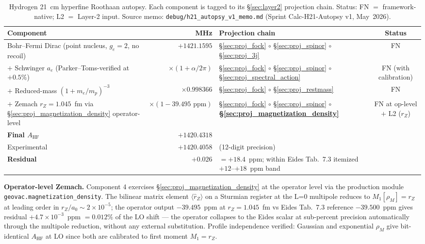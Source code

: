 \documentclass[11pt]{article}
\begin{document}
\begin{table}[h]
\centering\small
\begin{tabular}{p{4cm} r p{6cm} c}
\toprule
Component & MHz & Projection chain & Status \\
\midrule
Bohr--Fermi Dirac (point nucleus, $g_e=2$, no recoil) & $+1421.1595$ &
\S\ref{sec:proj_fock} $\circ$ \S\ref{sec:proj_spinor} $\circ$
\S\ref{sec:proj_3j} & FN \\
$+$ Schwinger $a_e$ (Parker--Toms-verified at $+0.5\%$) & $\times (1+\alpha/2\pi)$ &
\S\ref{sec:proj_fock} $\circ$ \S\ref{sec:proj_spinor} $\circ$
\S\ref{sec:proj_spectral_action} & FN (with calibration) \\
$+$ Reduced-mass $(1+m_e/m_p)^{-3}$ & $\times 0.998366$ &
\S\ref{sec:proj_fock} $\circ$ \S\ref{sec:proj_restmass} & FN \\
$+$ Zemach $r_Z=1.045$~fm via \S\ref{sec:proj_magnetization_density}
operator-level & $\times (1 - 39.495 \text{~ppm})$ &
\S\ref{sec:proj_fock} $\circ$ \S\ref{sec:proj_spinor} $\circ$
\textbf{\S\ref{sec:proj_magnetization_density}} & FN at op-level $+$ L2 ($r_Z$) \\
\midrule
\textbf{Final $A_\text{HF}$} & $+1420.4318$ & & \\
Experimental & $+1420.4058$ & (12-digit precision) & \\
\textbf{Residual} & $+0.026$ & $= +18.4$~ppm; within Eides Tab.~7.3 itemized $+12$--$+18$~ppm band & \\
\bottomrule
\end{tabular}
\caption{Hydrogen 21~cm hyperfine Roothaan autopsy.  Each component is
tagged to its \S\ref{sec:layer2} projection chain.  Status: FN $=$
framework-native; L2 $=$ Layer-2 input.  Source memo:
\texttt{debug/h21\_autopsy\_v1\_memo.md} (Sprint Calc-H21-Autopsy v1, May~2026).}
\label{tab:autopsy_21cm}
\end{table}

\textbf{Operator-level Zemach.}  Component 4 exercises
\S\ref{sec:proj_magnetization_density} at the operator level via the
production module \texttt{geovac.magnetization\_density}.  The bilinear
matrix element $\langle \hat{r}_Z\rangle$ on a Sturmian register at
the L=0 multipole reduces to $M_1[\rho_M] = r_Z$ at leading order in
$r_Z/a_0 \sim 2\times 10^{-5}$; the operator output $-39.495$~ppm at
$r_Z = 1.045$~fm vs Eides Tab.~7.3 reference $-39.500$~ppm gives
residual $+4.7\times 10^{-3}$~ppm $= 0.012\%$ of the LO shift --- the
operator collapses to the Eides scalar at sub-percent precision
automatically through the multipole reduction, without any external
substitution.  Profile independence verified: Gaussian and exponential
$\rho_M$ give bit-identical $A_\text{HF}$ at LO since both are
calibrated to first moment $M_1 = r_Z$.
\end{document}
